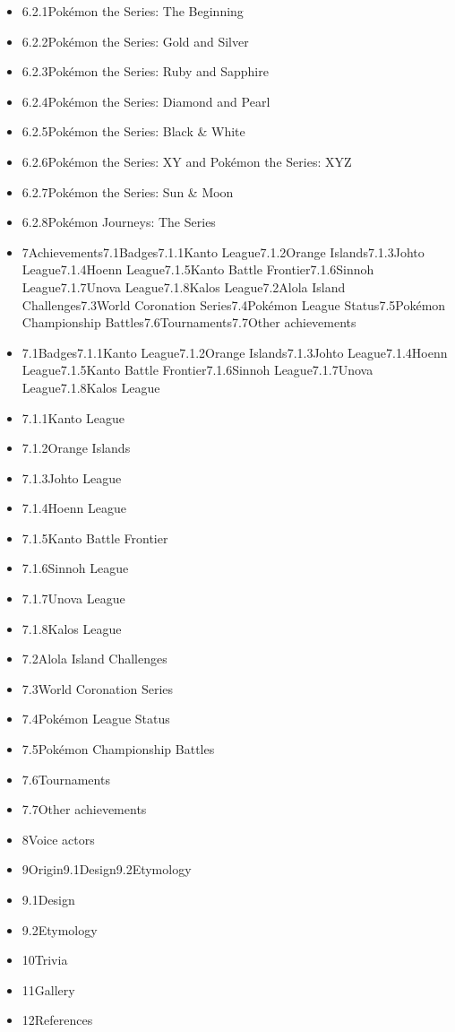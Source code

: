 \documentclass[a4paper,12pt]{article}
\begin{document}
\begin{itemize}
\item 6.2.1Pokémon the Series: The Beginning
\item 6.2.2Pokémon the Series: Gold and Silver
\item 6.2.3Pokémon the Series: Ruby and Sapphire
\item 6.2.4Pokémon the Series: Diamond and Pearl
\item 6.2.5Pokémon the Series: Black & White
\item 6.2.6Pokémon the Series: XY and Pokémon the Series: XYZ
\item 6.2.7Pokémon the Series: Sun & Moon
\item 6.2.8Pokémon Journeys: The Series
\item 7Achievements7.1Badges7.1.1Kanto League7.1.2Orange Islands7.1.3Johto League7.1.4Hoenn League7.1.5Kanto Battle Frontier7.1.6Sinnoh League7.1.7Unova League7.1.8Kalos League7.2Alola Island Challenges7.3World Coronation Series7.4Pokémon League Status7.5Pokémon Championship Battles7.6Tournaments7.7Other achievements
\item 7.1Badges7.1.1Kanto League7.1.2Orange Islands7.1.3Johto League7.1.4Hoenn League7.1.5Kanto Battle Frontier7.1.6Sinnoh League7.1.7Unova League7.1.8Kalos League
\item 7.1.1Kanto League
\item 7.1.2Orange Islands
\item 7.1.3Johto League
\item 7.1.4Hoenn League
\item 7.1.5Kanto Battle Frontier
\item 7.1.6Sinnoh League
\item 7.1.7Unova League
\item 7.1.8Kalos League
\item 7.2Alola Island Challenges
\item 7.3World Coronation Series
\item 7.4Pokémon League Status
\item 7.5Pokémon Championship Battles
\item 7.6Tournaments
\item 7.7Other achievements
\item 8Voice actors
\item 9Origin9.1Design9.2Etymology
\item 9.1Design
\item 9.2Etymology
\item 10Trivia
\item 11Gallery
\item 12References
\end{itemize}\\ \par \vspace{0.5cm}
\end{document}
